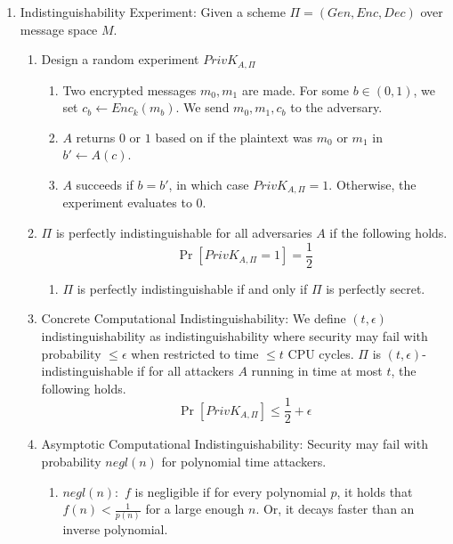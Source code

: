 \documentclass[12pt,letterpaper]{article}
\begin{document}
\begin{enumerate}
        \item
            Indistinguishability Experiment: Given a scheme $\Pi=(Gen, Enc, Dec)$ over message space $M$.
            \begin{enumerate}
                \item Design a random experiment $PrivK_{A,\Pi}$
                    \begin{enumerate}
                        \item
                            Two encrypted messages $m_0,m_1$ are made. For some $b\in(0,1)$, we set $c_b\leftarrow Enc_k(m_b)$. We send $m_0,m_1,c_b$ to the adversary.
                        \item $A$ returns $0$ or $1$ based on if the plaintext was $m_0$ or $m_1$ in $b'\leftarrow A(c)$.
                        \item $A$ succeeds if $b=b'$, in which case $PrivK_{A,\Pi}=1$. Otherwise, the experiment evaluates to 0.
                    \end{enumerate}
                \item $\Pi$ is perfectly indistinguishable for all adversaries $A$ if the following holds.
                    \[\Pr[PrivK_{A,\Pi}=1]=\frac{1}{2}\]
                    \begin{enumerate}
                        \item $\Pi$ is perfectly indistinguishable if and only if $\Pi$ is perfectly secret.
                    \end{enumerate}
                \item Concrete Computational Indistinguishability: We define $(t,\epsilon)$ indistinguishability as indistinguishability where security may fail with probability $\leq\epsilon$ when restricted to time $\leq t$ CPU cycles. $\Pi$ is $(t,\epsilon)$-indistinguishable if for all attackers $A$ running in time at most $t$, the following holds.
                    \[\Pr[PrivK_{A,\Pi}]\leq\frac{1}{2}+\epsilon\]
                \item Asymptotic Computational Indistinguishability: Security may fail with probability $negl(n)$ for polynomial time attackers.
                    \begin{enumerate}
                        \item $negl(n):$ $f$ is negligible if for every polynomial $p$, it holds that $f(n)<\frac{1}{p(n)}$ for a large enough $n$. Or, it decays faster than an inverse polynomial.
                    \end{enumerate}

\end{enumerate}
\end{enumerate}
\end{document}
